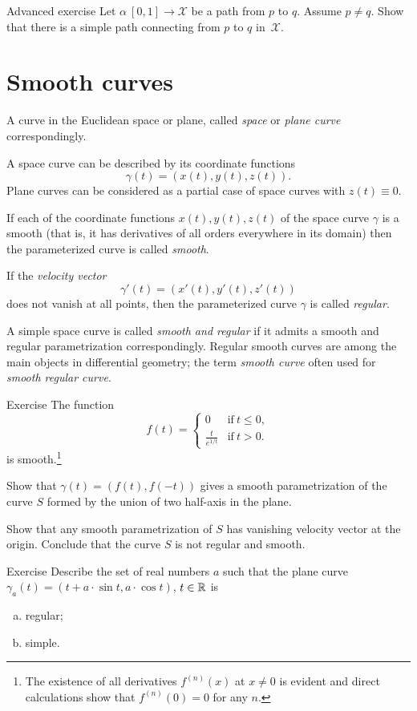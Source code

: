 \begin{thm}{Advanced exercise}
Let $\alpha\:[0,1]\to\mathcal{X}$ be a path from $p$ to $q$.
Assume $p\ne q$.
Show that there is a simple path connecting from $p$ to $q$ in~$\mathcal{X}$.
\end{thm}

\section*{Smooth curves}

A curve in the Euclidean space or plane, called \emph{space} or \emph{plane curve} correspondingly.

A space curve can be described by its coordinate functions 
\[\gamma(t)=(x(t),y(t),z(t)).\]
Plane curves can be considered as a partial case of space curves with $z(t)\equiv 0$.

If each of the coordinate functions $x(t),y(t),z(t)$ of the space curve $\gamma$ is a smooth (that is, it has derivatives of all orders everywhere in its domain) then the parameterized curve is called \emph{smooth}.

If the \emph{velocity vector} 
\[\gamma'(t)=(x'(t),y'(t),z'(t))\] 
does not vanish at all points, then the parameterized curve $\gamma$ is called \emph{regular}.

A simple space curve is called \emph{smooth and regular} if it admits a smooth and regular parametrization correspondingly.
Regular smooth curves are among the main objects in differential geometry;
the term \emph{smooth curve} often used for \emph{smooth regular curve}. 

\begin{thm}{Exercise}\label{ex:L-shape}
The function 
\[f(t)=
\begin{cases}
0&\text{if}\ t\le 0,
\\
\frac{t}{e^{1\!/\!t}}&\text{if}\ t> 0.
\end{cases}
\]
is smooth.\footnote{The existence of all derivatives $f^{(n)}(x)$ at $x\ne 0$ is evident and direct calculations show that $f^{(n)}(0)=0$ for any $n$.}

Show that $\gamma(t)=(f(t),f(-t))$ gives a smooth parametrization of the curve $S$ formed by the union of two half-axis in the plane.

Show that any smooth parametrization of $S$ has vanishing velocity vector at the origin.
Conclude that the curve $S$ is not regular and smooth.
\end{thm}


\begin{thm}{Exercise}\label{ex:cycloid}
Describe the set of real numbers $a$
such that the plane curve $\gamma_a(t)= (t+a\cdot \sin t,a\cdot \cos t)$, $t\in\mathbb{R}$ is
\begin{enumerate}[(a)]
\item regular;
\item simple.
\end{enumerate}

\end{thm}

